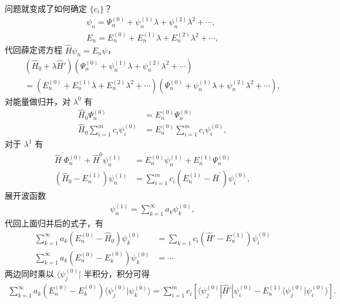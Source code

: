 问题就变成了如何确定 $\{c_i\}$？
\begin{align}
    \psi_n = \Psi_n^{(0)} + \psi_n^{(1)} \lambda + \psi_n^{(2)} \lambda^2 + \cdots ,\\
    E_n = E_n^{(0)} + E_n^{(1)} \lambda + E_n^{(2)} \lambda^2 + \cdots ,
\end{align}
代回薛定谔方程 $\hat H \psi_n = E_n \psi$，
\begin{multline}
    (\hat H_0 + \lambda \hat H ') 
    \left(
        \Psi_n^{(0)} + \psi_n^{(1)} \lambda + \psi_n^{(2)} \lambda^2 + \cdots
    \right) \\
    = 
    \left(
        E_n^{(0)} + E_n^{(1)} \lambda + E_n^{(2)} \lambda^2 + \cdots
    \right)
    \left(
        \Psi_n^{(0)} + \psi_n^{(1)} \lambda + \psi_n^{(2)} \lambda^2 + \cdots
    \right), 
\end{multline}
对能量做归并，对 $\lambda^0$ 有
\begin{align}
    \hat H_0 \Psi_n^{(0)} &= E_n^{(0)} \Psi_n^{(0)} \\
    \hat H_0 \sum_{i=1}^m c_i \psi_i^{(0)} &= E_n^{(0)} \sum_{i=1}^m c_i \psi_i^{(0)},
\end{align}
对于 $\lambda^1$ 有
\begin{align}
    \hat{H}^{\prime} \Phi_n^{(0)}+\hat{H}^0 \psi_n^{(1)}&=E_n^{(0)} \psi_n^{(1)}+E_n^{(1)} \Psi_n^{(0)} \\
    \left(\hat{H}_0-E_n^{(1)}\right) \psi_n^{(1)}&=\sum_{i=1}^m c_i\left(E_n^{(1)}-\bar{H}^{\prime}\right) \psi_i^{(0)},
\end{align}
展开波函数
\begin{align}
    \psi_n^{(1)} = \sum_{k=1}^{\infty} a_k \psi_k^{(0)},
\end{align}
代回上面归并后的式子，有
\begin{align}
    \sum_{k=1}^{\infty} a_k (E_n^{(0)} - \hat H_0) \psi_k^{(0)} &= \sum_{k=1} c_i (\hat H' - E_n^{(1)}) \psi_i^{(0)} \\
    \sum_{k=1}^{\infty} a_k (E_n^{(0)} - E_k^{(0)}) \psi_k^{(0)} &= \cdots
\end{align}
两边同时乘以 $\langle \psi_j^{(0)} |$ 半积分，积分可得
\begin{align}
    \sum_{k=1}^{\infty} a_k (E_n^{(0)} - E_k^{(0)}) \langle \psi_j^{(0)} | \psi_k^{(0)} \rangle = \sum_{i=1}^{m} c_i \left[
        \langle \psi_j^{(0)} | \hat H' | \psi_i^{(0)}
        - E_n^{(1)} \langle \psi_j^{(0)} | \psi_i^{(0)} \rangle
    \right]. 
\end{align}

